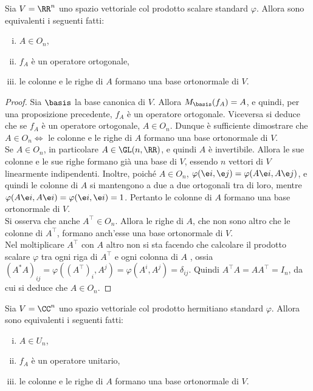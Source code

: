 \begin{proposition}
	Sia $V = \RR^n$ uno spazio vettoriale col prodotto scalare standard $\varphi$. Allora sono equivalenti i seguenti fatti:
	
	\begin{enumerate}[(i)]
		\item $A \in O_n$,
		\item $f_A$ è un operatore ortogonale,
		\item le colonne e le righe di $A$ formano una base ortonormale di $V$.
	\end{enumerate}
\end{proposition}

\begin{proof}
	Sia $\basis$ la base canonica di $V$. Allora $M_\basis(f_A) = A$, e quindi, per una proposizione
	precedente, $f_A$ è un operatore ortogonale. Viceversa si deduce che se $f_A$ è un operatore ortogonale,
	$A \in O_n$. Dunque è sufficiente dimostrare che $A \in O_n \iff$ le colonne e le righe di $A$ formano una
	base ortonormale di $V$. \\
	
	\rightproof Se $A \in O_n$, in particolare $A \in \GL(n, \RR)$, e quindi $A$ è invertibile. Allora le
	sue colonne e le sue righe formano già una base di $V$, essendo $n$ vettori di $V$ linearmente indipendenti.
	Inoltre, poiché $A \in O_n$, $\varphi(\e i, \e j) = \varphi(A \e i, A \e j)$, e quindi le colonne di $A$ si mantengono a due a due ortogonali tra di loro, mentre $\varphi(A \e i, A \e i) = \varphi(\e i, \e i) = 1$.
	Pertanto le colonne di $A$ formano una base ortonormale di $V$. \\
	
	Si osserva che anche $A^\top \in O_n$. Allora le righe di $A$, che non sono altro che
	le colonne di $A^\top$, formano anch'esse una base ortonormale di $V$. \\
	
	\leftproof Nel moltiplicare $A^\top$ con $A$ altro non si sta facendo che calcolare il prodotto
	scalare $\varphi$ tra ogni riga di $A^\top$ e ogni colonna di $A$	, ossia $(A^* A)_{ij} = \varphi((A^\top)_i, A^j) = \varphi(A^i, A^j) = \delta_{ij}$.
	Quindi $A^\top A = A A^\top = I_n$, da cui si deduce che $A \in O_n$.
\end{proof}

\begin{proposition}
	Sia $V = \CC^n$ uno spazio vettoriale col prodotto hermitiano standard $\varphi$. Allora sono equivalenti i seguenti fatti:
	
	\begin{enumerate}[(i)]
		\item $A \in U_n$,
		\item $f_A$ è un operatore unitario,
		\item le colonne e le righe di $A$ formano una base ortonormale di $V$.
	\end{enumerate}
\end{proposition}

